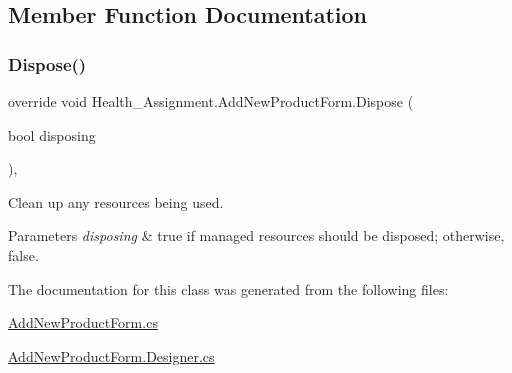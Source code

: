 \subsection{Member Function Documentation}
\mbox{\label{class_health___assignment_1_1_add_new_product_form_a97a68d272991de4e926b7f701933ff19}} 
\subsubsection{\texorpdfstring{Dispose()}{Dispose()}}
{\footnotesize\ttfamily override void Health\+\_\+\+Assignment.\+Add\+New\+Product\+Form.\+Dispose (\begin{DoxyParamCaption}\item[{bool}]{disposing }\end{DoxyParamCaption})\hspace{0.3cm}{\ttfamily [inline]}, {\ttfamily [protected]}}



Clean up any resources being used. 


\begin{DoxyParams}{Parameters}
{\em disposing} & true if managed resources should be disposed; otherwise, false.\\
\hline
\end{DoxyParams}


The documentation for this class was generated from the following files\+:\begin{DoxyCompactItemize}
\item 
\hyperlink{_add_new_product_form_8cs}{Add\+New\+Product\+Form.\+cs}\item 
\hyperlink{_add_new_product_form_8_designer_8cs}{Add\+New\+Product\+Form.\+Designer.\+cs}\end{DoxyCompactItemize}
